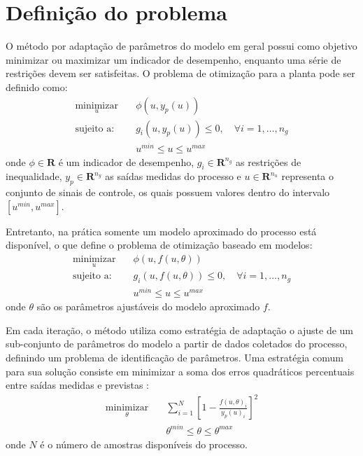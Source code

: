 \documentclass[conference]{IEEEtran}
\begin{document}
\section{Definição do problema}
O método por adaptação de parâmetros do modelo em geral possui como objetivo minimizar ou maximizar um indicador de desempenho, enquanto uma série de restrições devem ser satisfeitas. O problema de otimização para a planta pode ser definido como:
\begin{equation}
	\begin{alignedat}{2}
		\underset{u}{\text{minimizar}} & \quad \phi(u, y_p(u))  \\
		\text{sujeito a:} & \quad g_i(u, y_p(u)) \leq 0, \quad \forall i = 1,\dots,n_g\\
		& \quad u^{min} \leq u \leq u^{max}
	\end{alignedat}
	\label{eq:rto_static}
\end{equation}
onde $\phi \in \mathbf{R}$ é um indicador de desempenho, $g_i \in \mathbf{R}^{n_g}$ as restrições de inequalidade, $y_p \in \mathbf{R}^{n_y}$ as saídas medidas do processo e $u \in \mathbf{R}^{n_u}$ representa o conjunto de sinais de controle, os quais possuem valores dentro do intervalo $[u^{min},u^{max}]$.

Entretanto, na prática somente um modelo aproximado do processo está disponível, o que define o problema de otimização baseado em modelos:
\begin{equation}
	\begin{alignedat}{2}
		\underset{u}{\text{minimizar}} & \quad \phi(u, f(u,\theta))  \\
		\text{sujeito a:} & \quad g_i(u, f(u,\theta)) \leq 0, \quad \forall i = 1,\dots,n_g \\
		& \quad u^{min} \leq u \leq u^{max}
	\end{alignedat}
	\label{eq:rto_static_uncertain}
\end{equation}
onde $\theta$ são os parâmetros ajustáveis do modelo aproximado $f$.

Em cada iteração, o método utiliza como estratégia de adaptação o ajuste de um sub-conjunto de parâmetros do modelo a partir de dados coletados do processo, definindo um problema de identificação de parâmetros. Uma estratégia comum para sua solução consiste em minimizar a soma dos erros quadráticos percentuais entre saídas medidas e previstas \cite{chachuat2009adaptation}:
\begin{equation}
	\begin{alignedat}{2}
		\underset{\theta}{\text{minimizar}} & \quad \sum_{i=1}^{N}  \left[ 1 - \frac{f(u,\theta)_i}{y_{p}(u)_i }  \right] ^2 \\
		& \quad \theta^{min} \leq \theta \leq \theta^{max}
	\end{alignedat}
	\label{eq:rto_static_ident}
\end{equation}
onde $N$ é o número de amostras disponíveis do processo.
\end{document}
